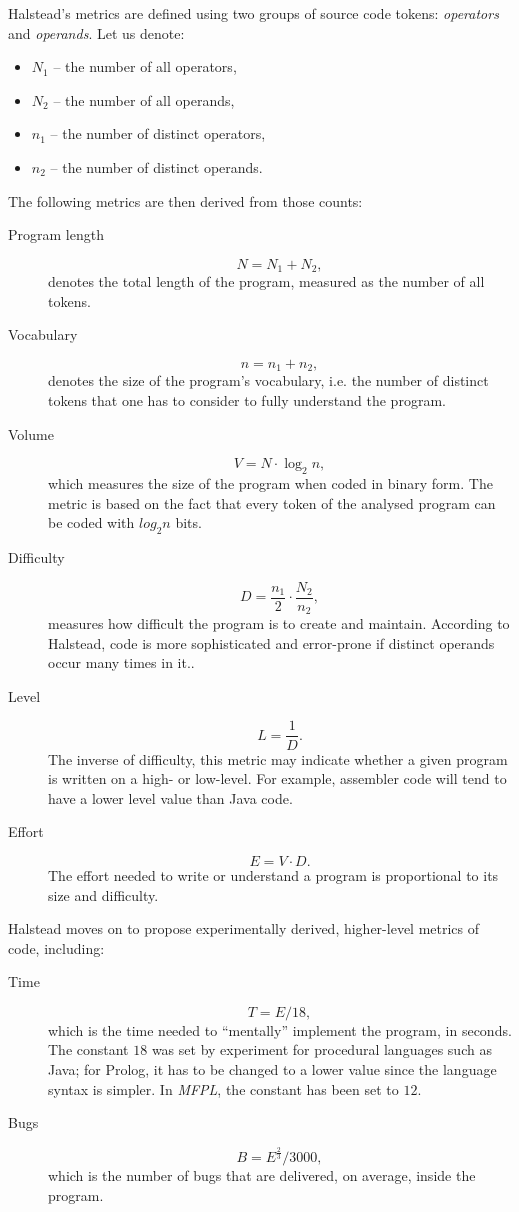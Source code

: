 \documentclass[11pt,a4paper,twoside]{article}
\begin{document}
\begin{multicols}{2}
Halstead's metrics are defined using two groups of source code tokens:
\emph{operators} and \emph{operands}. Let us denote:
\begin{itemize}
\item $N_1$ -- the number of all operators, 
\item $N_2$ -- the number of all operands, 
\item $n_1$ -- the number of distinct operators, 
\item $n_2$ -- the number of distinct operands.
\end{itemize}

The following metrics are then derived from those counts:
\begin{description}
\item[Program length]
  $$N = N_1 + N_2,$$ denotes the total length of the program, measured
  as the number of all tokens.
\item[Vocabulary]
  $$n = n_1 + n_2,$$ denotes the size of the program's vocabulary,
  i.e.  the number of distinct tokens that one has to consider to
  fully understand the program.
\item[Volume]
  $$V = N \cdot \log_2n,$$ which measures the size of the program when
  coded in binary form. The metric is based on the fact that every
  token of the analysed program can be coded with $log_2n$ bits.
\item[Difficulty]
  $$D = \frac{n_1}{2}\cdot\frac{N_2}{n_2},$$ measures how difficult
  the program is to create and maintain. According to Halstead, code
  is more sophisticated and error-prone if distinct operands occur
  many times in it..
\item[Level]
  $$L = \frac{1}{D}.$$ The inverse of difficulty, this metric may
  indicate whether a given program is written on a high- or
  low-level. For example, assembler code will tend to have a lower
  level value than Java code.
\item[Effort]
  $$E = V \cdot D.$$ The effort needed to write or understand a
  program is proportional to its size and difficulty.
\end{description}

Halstead moves on to propose experimentally derived, higher-level
metrics of code, including:
\begin{description}
\item[Time]
$$T = E/18,$$ which is the time needed to ``mentally'' implement the
  program, in seconds. The constant $18$ was set by experiment for
  procedural languages such as Java; for Prolog, it has to be changed
  to a lower value since the language syntax is simpler. In \emph{MFPL}, 
  the constant has been set to $12$.
\item[Bugs]
$$B = E^{\frac{2}{3}}/3000,$$ which is the number of bugs that are
  delivered, on average, inside the program.
\end{description}


\end{multicols}
\end{document}
